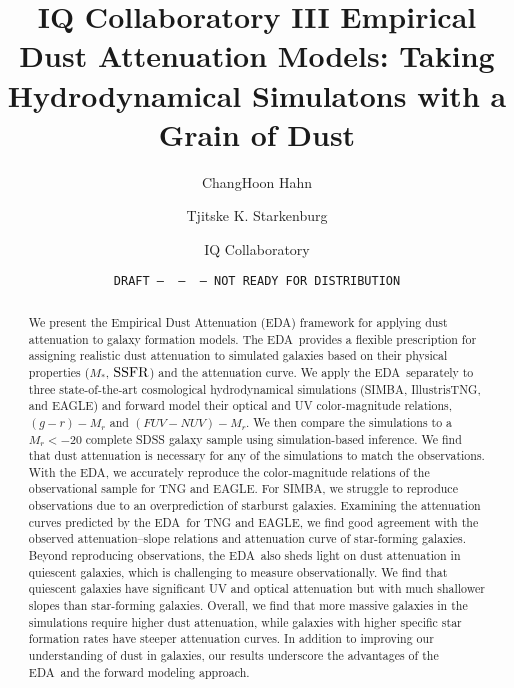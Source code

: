 \documentclass[12pt, letterpaper, preprint, comicneue]{aastex63}
\newcommand{\gr}{g{-}r}
\newcommand{\fnuv}{FUV{-}NUV}
\newcommand{\ssfr}{{\rm SSFR}}
\newcommand{\eda}{EDA}
\newcommand{\ch}[1]{{\color{orange}#1}}
\begin{document}
 \sloppy\sloppypar\frenchspacing 

\title{IQ Collaboratory III Empirical Dust Attenuation Models: Taking Hydrodynamical Simulatons with a Grain of Dust}
\date{\texttt{DRAFT~---~\githash~---~\gitdate~---~NOT READY FOR DISTRIBUTION}}

\author{ChangHoon Hahn}

\author{Tjitske K. Starkenburg}

\author{IQ Collaboratory}

\begin{abstract}
    We present the Empirical Dust Attenuation (\eda) framework for applying
    dust attenuation to galaxy formation models.
    \ch{
        The \eda~provides a flexible prescription for assigning realistic dust
        attenuation to simulated galaxies based on their physical properties
        ($M_*$, $\ssfr$) and the \cite{noll2009} attenuation curve. 
    }
    We apply the \eda~separately to three state-of-the-art cosmological
    hydrodynamical simulations (SIMBA, IllustrisTNG, and EAGLE) and forward
    model their optical and UV
    color-magnitude relations, $(\gr) - M_r$ and $(\fnuv)-M_r$. 
    We then compare the simulations to a $M_r < -20$ complete SDSS galaxy sample
    using simulation-based inference. 
    \ch{
        We find that dust attenuation is necessary for any of the simulations
        to match the observations. 
    }
    With the \eda, we accurately reproduce the color-magnitude relations of the
    observational sample for TNG and EAGLE. 
    For SIMBA, we struggle to reproduce observations due to an overprediction
    of starburst galaxies. 
    \ch{ 
        Examining the attenuation curves predicted by the \eda~for TNG and
        EAGLE, we find good agreement with the observed attenuation--slope
        relations and attenuation curve of star-forming galaxies.
    }
    Beyond reproducing observations,
    the \eda~also sheds light on dust attenuation in quiescent galaxies, which
    is challenging to measure observationally. We find that quiescent galaxies 
    have significant UV and optical attenuation but with much shallower
    slopes than star-forming galaxies. 
    \ch{ 
        Overall, we find that more massive galaxies in the simulations require
        higher dust attenuation, 
    }
    while galaxies with higher specific star formation rates have steeper 
    attenuation curves.
    In addition to improving our understanding of dust in galaxies, our results
    underscore the advantages of the \eda~and the forward modeling approach. 
\end{abstract}
\end{document}
